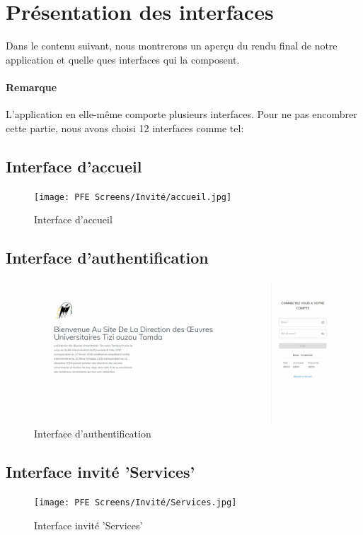 \section{Présentation des interfaces}
    Dans le contenu suivant, nous montrerons un aperçu du rendu final de notre application et quelle ques interfaces qui la composent.

    \paragraph*{Remarque} L'application en elle-même comporte plusieurs interfaces. Pour ne pas encombrer cette partie, nous avons choisi 12 interfaces comme tel:

    \subsection{Interface d'accueil}
    \begin{figure}[H]
        \centering
        \texttt{[image: PFE Screens/Invité/accueil.jpg]}
        \caption{Interface d'accueil}
    \end{figure}

    \subsection{Interface d'authentification}
    \begin{figure}[H]
        \centering
        \includegraphics[scale=0.21]{PFE Screens/Connection.jpg}
        \caption{Interface d'authentification}
    \end{figure}

    \subsection{Interface invité 'Services'}
    \begin{figure}[H]
        \centering
        \texttt{[image: PFE Screens/Invité/Services.jpg]}
        \caption{Interface invité 'Services'}
    \end{figure}

